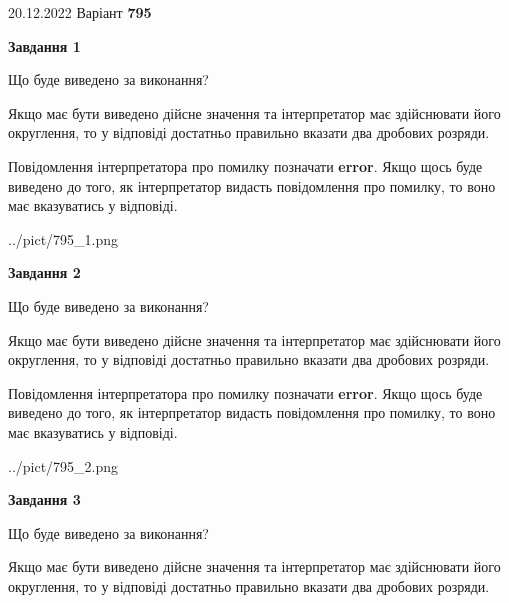 \documentclass[12pt, ukrainian]{article}
\begin{document}
{20.12.2022 Варіант \No \textbf { 795 }\par}
{
\begin {Large}

{\begin {center}\textbf{Завдання 1}\end {center}}\par
Що буде виведено за виконання? \par

Якщо має бути виведено дійсне значення та інтерпретатор має здійснювати його округлення, 
то у відповіді достатньо правильно вказати два дробових розряди.

Повідомлення інтерпретатора про помилку позначати \textbf{error}.
Якщо щось буде виведено до того, як інтерпретатор видасть повідомлення про помилку, 
то воно має вказуватись у відповіді. \par

\begin{center}
	{../pict/795_1.png}
\end{center}
\newpage

{\begin {center}\textbf{Завдання 2}\end {center}}\par
Що буде виведено за виконання? \par

Якщо має бути виведено дійсне значення та інтерпретатор має здійснювати його округлення, 
то у відповіді достатньо правильно вказати два дробових розряди.

Повідомлення інтерпретатора про помилку позначати \textbf{error}.
Якщо щось буде виведено до того, як інтерпретатор видасть повідомлення про помилку, 
то воно має вказуватись у відповіді. \par

\begin{center}
	{../pict/795_2.png}
\end{center}
\newpage

{\begin {center}\textbf{Завдання 3}\end {center}}\par
Що буде виведено за виконання? \par

Якщо має бути виведено дійсне значення та інтерпретатор має здійснювати його округлення, 
то у відповіді достатньо правильно вказати два дробових розряди.


\end{Large}}
\end{document}
